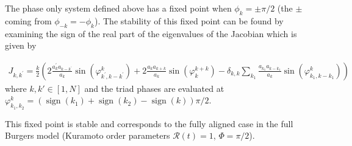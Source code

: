 \documentclass[9pt]{article}
\begin{document}
The phase only system defined above has a fixed point when $\phi_k = \pm \pi/2$ (the $\pm$ coming from  $\phi_{-k} = -\phi_k$). The stability of this fixed point can be found by examining the sign of the real part of the eigenvalues of the Jacobian which is given by 

\begin{align}
	J_{k, k^{\prime}}=\frac{k}{2}\left(2 \frac{a_{k}^{\prime} a_{k-k^{\prime}}}{a_{k}} \sin \left(\varphi_{k^{\prime}, k-k^{\prime}}^{k}\right)+2 \frac{a_{k} a_{k+k}}{a_{k}} \sin \left(\varphi_{k}^{k+k}\right)-\delta_{k, k} \sum_{k_{1}} \frac{a_{k_{1}} a_{k-k_{1}}}{a_{k}} \sin \left(\varphi_{k_{1}, k-k_{1}}^{k}\right)\right)
	\label{eq:jaco}
\end{align}
where $k, k' \in [1, N]$ and the triad phases are evaluated at $\varphi_{k_{1}, k_{2}}^{k}=\left(\operatorname{sign}\left(k_{1}\right)+\operatorname{sign}\left(k_{2}\right)-\operatorname{sign}(k)\right) \pi / 2$.


This fixed point is stable and corresponds to the fully aligned case in the full Burgers model (Kuramoto order parameters $\mathcal{R}(t) = 1$, $\Phi = \pi/2$). 





\end{document}

